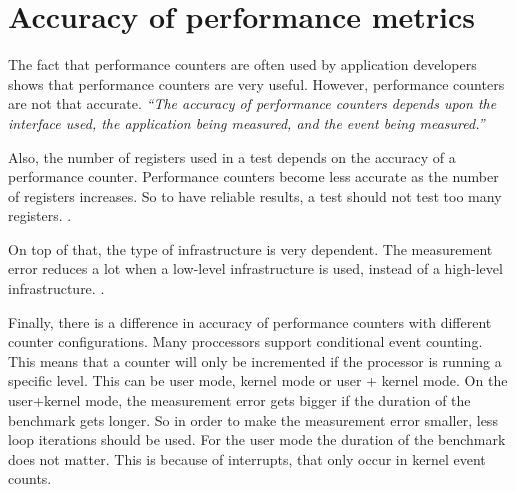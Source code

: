 \section{Accuracy of performance metrics}
The fact that performance counters are often used by application developers shows that performance counters are very useful. However, performance counters are not that accurate. \textit{``The accuracy of performance counters depends upon the interface used, the application being measured, and the event being measured.''}\cite{korn2001just}

Also, the number of registers used in a test depends on the accuracy of a performance counter. Performance counters become less accurate as the number of registers increases. So to have reliable results, a test should not test too many registers. \cite{AccuracyPerformanceCounter}.

On top of that, the type of infrastructure is very dependent. The measurement error reduces a lot when a low-level infrastructure is used, instead of a high-level infrastructure. \cite{AccuracyPerformanceCounter}.

Finally, there is a difference in accuracy of performance counters with different counter configurations. Many proccessors support conditional event counting. This means that a counter will only be incremented if the processor is running a specific level. This can be user mode, kernel mode or user + kernel mode. On the user+kernel mode, the measurement error gets bigger if the duration of the benchmark gets longer. \cite{AccuracyPerformanceCounter} So in order to make the measurement error smaller, less loop iterations should be used. For the user mode the duration of the benchmark does not matter. This is because of interrupts, that only occur in kernel event counts.



